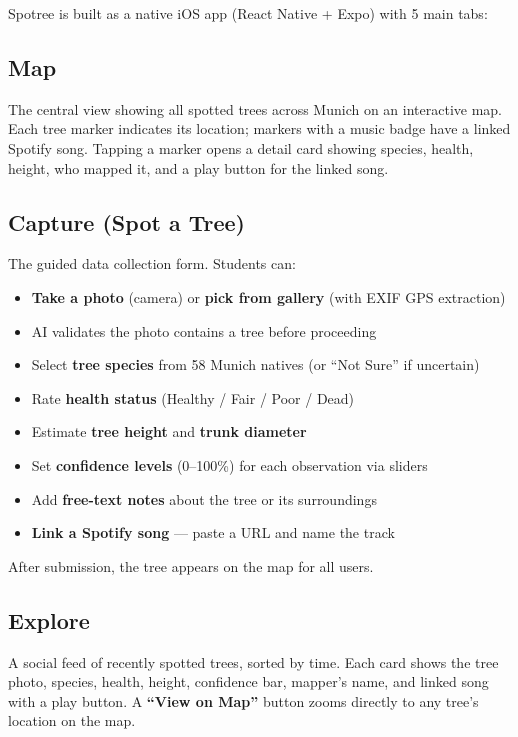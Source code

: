 \documentclass[11pt,a4paper]{article}
\begin{document}
Spotree is built as a native iOS app (React Native + Expo) with 5 main tabs:

\subsection{Map}
The central view showing all spotted trees across Munich on an interactive map. Each tree marker indicates its location; markers with a music badge have a linked Spotify song. Tapping a marker opens a detail card showing species, health, height, who mapped it, and a play button for the linked song.

\subsection{Capture (Spot a Tree)}
The guided data collection form. Students can:
\begin{itemize}[nosep]
  \item \textbf{Take a photo} (camera) or \textbf{pick from gallery} (with EXIF GPS extraction)
  \item AI validates the photo contains a tree before proceeding
  \item Select \textbf{tree species} from 58 Munich natives (or ``Not Sure'' if uncertain)
  \item Rate \textbf{health status} (Healthy / Fair / Poor / Dead)
  \item Estimate \textbf{tree height} and \textbf{trunk diameter}
  \item Set \textbf{confidence levels} (0--100\%) for each observation via sliders
  \item Add \textbf{free-text notes} about the tree or its surroundings
  \item \textbf{Link a Spotify song} --- paste a URL and name the track
\end{itemize}

After submission, the tree appears on the map for all users.

\subsection{Explore}
A social feed of recently spotted trees, sorted by time. Each card shows the tree photo, species, health, height, confidence bar, mapper's name, and linked song with a play button. A \textbf{``View on Map''} button zooms directly to any tree's location on the map.
\end{document}
